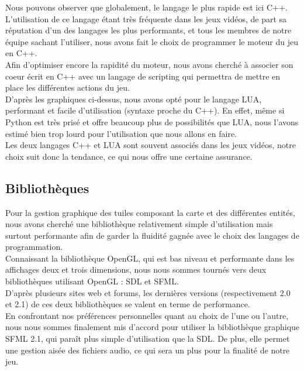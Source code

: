\documentclass[a4paper]{article}
\newcommand{\alinea}{\hspace*{0.5cm}}
\begin{document}
        \alinea Nous pouvons observer que globalement, le langage le plus rapide est ici C++. L'utilisation de ce langage étant très fréquente dans les jeux vidéos, de part sa réputation d'un des langages les plus performants, et tous les membres de notre équipe sachant l'utiliser, nous avons fait le choix de programmer le moteur du jeu en C++.\\
        \alinea Afin d'optimiser encore la rapidité du moteur, nous avons cherché à associer son coeur écrit en C++ avec un langage de scripting qui permettra de mettre en place les différentes actions du jeu.\\ D'après les graphiques ci-dessus, nous avons opté pour le langage LUA, performant et facile d'utilisation (syntaxe proche du C++). En effet, même si Python est très prisé et offre beaucoup plus de possibilités que LUA, nous l'avons estimé bien trop lourd pour l'utilisation que nous allons en faire.\\
        \alinea Les deux langages C++ et LUA sont souvent associés dans les jeux vidéos, notre choix suit donc la tendance, ce qui nous offre une certaine assurance.

      \subsection{Bibliothèques}
        \alinea Pour la gestion graphique des tuiles composant la carte et des différentes entités, nous avons cherché une bibliothèque relativement simple d'utilisation mais surtout performante afin de garder la fluidité gagnée avec le choix des langages de programmation.\\
        \alinea Connaissant la bibliothèque OpenGL, qui est bas niveau et performante dans les affichages deux et trois dimensions, nous nous sommes tournés vers deux bibliothèques utilisant OpenGL : SDL et SFML.\\
        \alinea D'après plusieurs sites web et forums, les dernières versions (respectivement 2.0 et 2.1) de ces deux bibliothèques se valent en terme de performance.\\
        \alinea En confrontant nos préférences personnelles quant au choix de l'une ou l'autre, nous nous sommes finalement mis d'accord pour utiliser la bibliothèque graphique SFML 2.1, qui paraît plus simple d'utilisation que la SDL. De plus, elle permet une gestion aisée des fichiers audio, ce qui sera un plus pour la finalité de notre jeu.
\end{document}
